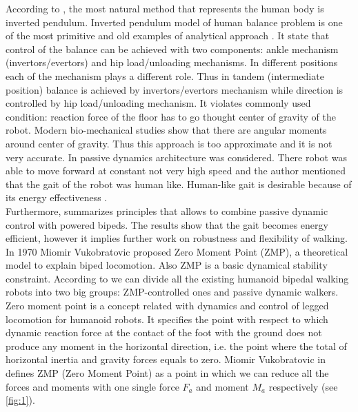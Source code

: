 \documentclass[12pt,a4paper]{report}
\begin{document}
		According to \cite{tang2008analysis}, the most natural method that represents the human body is inverted pendulum. Inverted pendulum model of human balance problem is one of the most primitive and old examples of analytical approach \cite{winter1995human}. It state that control of the balance can be achieved with two components: ankle mechanism (invertors/evertors) and hip load/unloading mechanisms. In different positions each of the mechanism plays a different role. Thus in tandem (intermediate position) balance is achieved by invertors/evertors mechanism while direction is controlled by hip load/unloading mechanism. It violates commonly used condition: reaction force of the floor has to go thought center of gravity of the robot. Modern bio-mechanical studies show that there are angular moments around center of gravity. 
		Thus this approach is too approximate and it is not very accurate. In \cite{collins2005bipedal} passive dynamics architecture was considered. There robot was able to move forward at constant not very high speed and the author mentioned that the gait of the robot was human like. Human-like gait is desirable because of its energy effectiveness \cite{golliday1977approach}.\\
		Furthermore, \cite{anderson2005powered} summarizes principles that allows to combine passive dynamic control with powered bipeds. The results show that the gait becomes energy efficient, however it implies further work on robustness and flexibility of walking.\\

		In 1970 Miomir Vukobratovic proposed Zero Moment Point (ZMP), a theoretical model to explain biped locomotion. Also ZMP is a basic dynamical stability constraint.
		According to \cite{manchester2011stable} we can divide all the existing humanoid bipedal walking robots into two big groups: ZMP-controlled ones and passive dynamic walkers.\\
		Zero moment point is a concept related with dynamics and control of legged locomotion for humanoid robots. It specifies the point with respect to which dynamic reaction force at the contact of the foot with the ground does not produce any moment in the horizontal direction, i.e. the point where the total of horizontal inertia and gravity forces equals to zero.
		Miomir Vukobratovic in \cite{vukobratovic2004zero} defines ZMP (Zero Moment Point) as a point in which we can reduce all the forces and moments with one single force $F_a$ and moment $M_a$ respectively  (see \cref{fig:1}).
	
\end{document}
